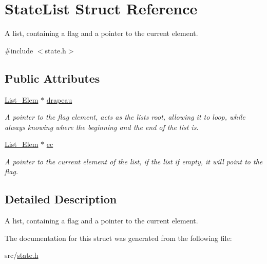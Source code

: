 \hypertarget{struct_state_list}{}\section{State\+List Struct Reference}
\label{struct_state_list}


A list, containing a flag and a pointer to the current element.  




{\ttfamily \#include $<$state.\+h$>$}

\subsection*{Public Attributes}
\begin{DoxyCompactItemize}
\item 
\mbox{\label{struct_state_list_a6f0e824aa109795c1b466ce69e471bbf}} 
\hyperlink{state_8h_ab8c49f96c64a8f87ba42ec735b9fd1fb}{List\+\_\+\+Elem} $\ast$ \hyperlink{struct_state_list_a6f0e824aa109795c1b466ce69e471bbf}{drapeau}
\begin{DoxyCompactList}\small\item\em A pointer to the flag element, acts as the list\textquotesingle{}s root, allowing it to loop, while always knowing where the beginning and the end of the list is. \end{DoxyCompactList}\item 
\mbox{\label{struct_state_list_a664e883a554e9304393557d561e7eed4}} 
\hyperlink{state_8h_ab8c49f96c64a8f87ba42ec735b9fd1fb}{List\+\_\+\+Elem} $\ast$ \hyperlink{struct_state_list_a664e883a554e9304393557d561e7eed4}{ec}
\begin{DoxyCompactList}\small\item\em A pointer to the current element of the list, if the list if empty, it will point to the flag. \end{DoxyCompactList}\end{DoxyCompactItemize}


\subsection{Detailed Description}
A list, containing a flag and a pointer to the current element. 

The documentation for this struct was generated from the following file\+:\begin{DoxyCompactItemize}
\item 
src/\hyperlink{state_8h}{state.\+h}\end{DoxyCompactItemize}
